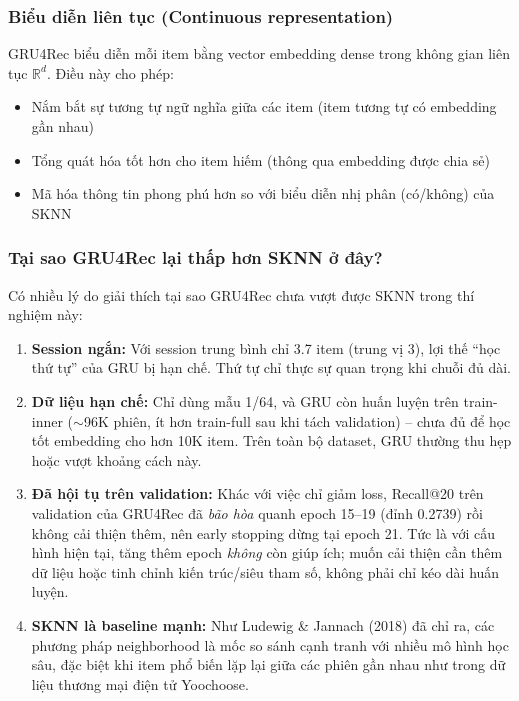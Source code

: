 \documentclass[12pt, a4paper]{article}
\begin{document}
\subsubsection{Biểu diễn liên tục (Continuous representation)}

GRU4Rec biểu diễn mỗi item bằng vector embedding dense trong không gian liên tục $\mathbb{R}^d$. Điều này cho phép:
\begin{itemize}
    \item Nắm bắt sự tương tự ngữ nghĩa giữa các item (item tương tự có embedding gần nhau)
    \item Tổng quát hóa tốt hơn cho item hiếm (thông qua embedding được chia sẻ)
    \item Mã hóa thông tin phong phú hơn so với biểu diễn nhị phân (có/không) của SKNN
\end{itemize}

\subsubsection{Tại sao GRU4Rec lại thấp hơn SKNN ở đây?}

Có nhiều lý do giải thích tại sao GRU4Rec chưa vượt được SKNN trong thí nghiệm này:

\begin{enumerate}
    \item \textbf{Session ngắn:} Với session trung bình chỉ 3.7 item (trung vị 3), lợi thế ``học thứ tự'' của GRU bị hạn chế. Thứ tự chỉ thực sự quan trọng khi chuỗi đủ dài.

    \item \textbf{Dữ liệu hạn chế:} Chỉ dùng mẫu 1/64, và GRU còn huấn luyện trên train-inner ($\sim$96K phiên, ít hơn train-full sau khi tách validation) -- chưa đủ để học tốt embedding cho hơn 10K item. Trên toàn bộ dataset, GRU thường thu hẹp hoặc vượt khoảng cách này.

    \item \textbf{Đã hội tụ trên validation:} Khác với việc chỉ giảm loss, Recall@20 trên validation của GRU4Rec đã \emph{bão hòa} quanh epoch 15--19 (đỉnh 0.2739) rồi không cải thiện thêm, nên early stopping dừng tại epoch 21. Tức là với cấu hình hiện tại, tăng thêm epoch \emph{không} còn giúp ích; muốn cải thiện cần thêm dữ liệu hoặc tinh chỉnh kiến trúc/siêu tham số, không phải chỉ kéo dài huấn luyện.

    \item \textbf{SKNN là baseline mạnh:} Như Ludewig \& Jannach (2018) \cite{ludewig2018} đã chỉ ra, các phương pháp neighborhood là mốc so sánh cạnh tranh với nhiều mô hình học sâu, đặc biệt khi item phổ biến lặp lại giữa các phiên gần nhau như trong dữ liệu thương mại điện tử Yoochoose.
\end{enumerate}
\end{document}
